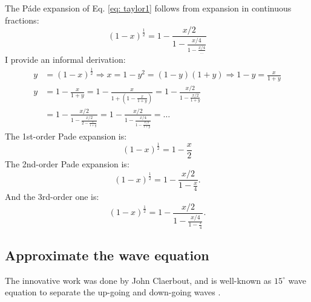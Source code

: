 The P\'{a}de expansion of Eq. \eqref{eq: taylor1} follows from expansion in continuous fractions:
\begin{equation}
(1-x)^{\frac{1}{2}}=1-\frac{x/2}{1-\frac{x/4}{1-\frac{x/4}{\ldots}}}
\end{equation}
I provide an informal derivation:
\begin{displaymath}
\begin{split}
y&=(1-x)^{\frac{1}{2}}\Rightarrow x=1-y^2=(1-y)(1+y)\Rightarrow 1-y=\frac{x}{1+y}\\
y&=1-\frac{x}{1+y}=1-\frac{x}{1+(1-\frac{x}{1+y})}=1-\frac{x/2}{1-\frac{x/2}{1+y}}\\
&=1-\frac{x/2}{1-\frac{x/2}{2-\frac{x}{1+y}}}
=1-\frac{x/2}{1-\frac{x/4}{1-\frac{x/2}{1+y}}}=\ldots
\end{split}
\end{displaymath}
The 1st-order Pade expansion is:
\begin{equation}
(1-x)^{\frac{1}{2}}=1-\frac{x}{2}
\end{equation}
The 2nd-order Pade expansion is:
\begin{equation}
(1-x)^{\frac{1}{2}}=1-\frac{x/2}{1-\frac{x}{4}}.
\end{equation}
And the 3rd-order one is:
\begin{equation}
(1-x)^{\frac{1}{2}}=1-\frac{x/2}{1-\frac{x/4}{1-\frac{x}{4}}}.
\end{equation}

\subsection{Approximate the wave equation}

The innovative work was done by John Claerbout, and is well-known as $15^{\circ}$ wave equation to separate the up-going and down-going waves \citep{claerbout1971toward,claerbout1986imaging}.

